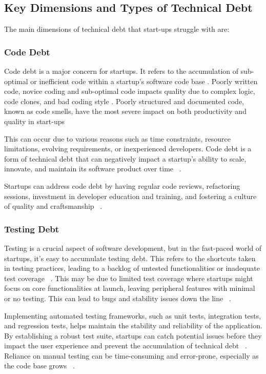 \subsection{Key Dimensions and Types of Technical Debt}
The main dimensions of technical debt that start-ups struggle with are:

\subsubsection{Code Debt} 
Code debt is a major concern for startups. It refers to the accumulation of sub-optimal or inefficient code within a startup's software code base . Poorly written code, novice coding and sub-optimal code impacts quality due to complex logic, code clones, and bad coding style . Poorly structured and documented code, known as code smells, have the most severe impact on both productivity and quality in start-ups ~\cite{Klotins2018/3183519.3183539}

This can occur due to various reasons such as time constraints, resource limitations, evolving requirements, or inexperienced developers. Code debt is a form of technical debt that can negatively impact a startup's ability to scale, innovate, and maintain its software product over time ~\cite{FowlerBottlenecks, Qualityv77:online}.

Startups can address code debt by having regular code reviews, refactoring sessions, investment in developer education and training, and fostering a culture of quality and craftsmanship ~\cite{10043622, Acknowle63:online}.

\subsubsection{Testing Debt}
Testing is a crucial aspect of software development, but in the fast-paced world of startups, it's easy to accumulate testing debt. This refers to the shortcuts taken in testing practices, leading to a backlog of untested functionalities or inadequate test coverage  ~\cite{Howtohan98:online}. This may be due to limited test coverage where startups might focus on core functionalities at launch, leaving peripheral features with minimal or no testing. This can lead to bugs and stability issues down the line ~\cite{Totalqua26:online}.

Implementing automated testing frameworks, such as unit tests, integration tests, and regression tests, helps maintain the stability and reliability of the application. By establishing a robust test suite, startups can catch potential issues before they impact the user experience and prevent the accumulation of technical debt ~\cite{TheImpac54:online}. Reliance on manual testing can be time-consuming and error-prone, especially as the code base grows ~\cite{Howtohan98:online}.

